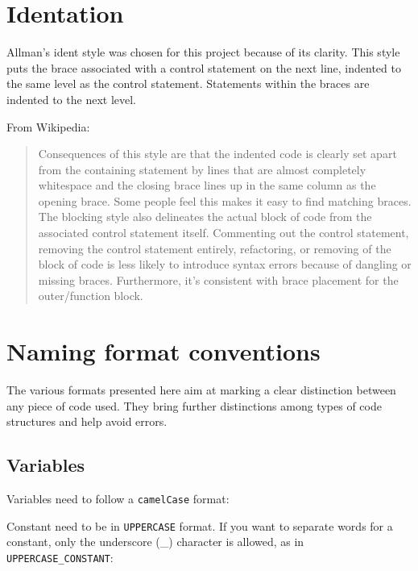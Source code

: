 \section{Identation}
  Allman's ident style was chosen for this project because of its clarity. 
  This style puts the brace associated with a control statement on the next 
  line, indented to the same level as the control statement. Statements within 
  the braces are indented to the next level.
  
  
  \clearpage
  
  From Wikipedia:
  
  \begin{quote}
  Consequences of this style are that the indented code is clearly set apart 
  from the containing statement by lines that are almost completely whitespace 
  and the closing brace lines up in the same column as the opening brace. Some 
  people feel this makes it easy to find matching braces. The blocking style 
  also delineates the actual block of code from the associated control 
  statement itself. Commenting out the control statement, removing the control 
  statement entirely, refactoring, or removing of the block of code is less 
  likely to introduce syntax errors because of dangling or missing braces. 
  Furthermore, it's consistent with brace placement for the outer/function 
  block.
  \end{quote}

\section{Naming format conventions}

The various formats presented here aim at marking a clear distinction between 
any piece of code used. They bring further distinctions among types of code 
structures and help avoid errors.

\subsection{Variables}

Variables need to follow a \texttt{camelCase} format:


Constant need to be in \texttt{UPPERCASE} format. If you want to separate words 
for a constant, only the underscore (\_) character is allowed, as in 
\texttt{UPPERCASE\_CONSTANT}:


